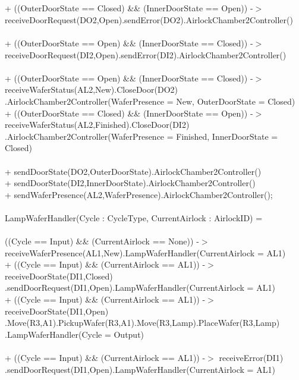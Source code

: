 \documentclass[a4paper,12pt]{article}
\begin{document}
	\\
	\\+ ((OuterDoorState == Closed) \&\& (InnerDoorState == Open)) -$>$ receiveDoorRequest(DO2,Open).sendError(DO2).AirlockChamber2Controller()
	\\
	\\+ ((OuterDoorState == Open) \&\& (InnerDoorState == Closed)) -$>$ receiveDoorRequest(DI2,Open).sendError(DI2).AirlockChamber2Controller()
	\\
	\\+ ((OuterDoorState == Open) \&\& (InnerDoorState == Closed)) -$>$ receiveWaferStatus(AL2,New).CloseDoor(DO2)
	\\.AirlockChamber2Controller(WaferPresence = New, OuterDoorState = Closed)
	\\+ ((OuterDoorState == Closed) \&\& (InnerDoorState == Open)) -$>$ receiveWaferStatus(AL2,Finished).CloseDoor(DI2)\\.AirlockChamber2Controller(WaferPresence = Finished, InnerDoorState = Closed)
	\\
	\\+ sendDoorState(DO2,OuterDoorState).AirlockChamber2Controller()
	\\+ sendDoorState(DI2,InnerDoorState).AirlockChamber2Controller()
	\\+ sendWaferPresence(AL2,WaferPresence).AirlockChamber2Controller();
	\\
	\\LampWaferHandler(Cycle : CycleType, CurrentAirlock : AirlockID) = 
	\\
	\\((Cycle == Input) \&\& (CurrentAirlock == None)) -$>$ receiveWaferPresence(AL1,New).LampWaferHandler(CurrentAirlock = AL1)
	\\+ ((Cycle == Input) \&\& (CurrentAirlock == AL1)) -$>$ receiveDoorState(DI1,Closed)
	\\.sendDoorRequest(DI1,Open).LampWaferHandler(CurrentAirlock = AL1)
	\\+ ((Cycle == Input) \&\& (CurrentAirlock == AL1)) -$>$ receiveDoorState(DI1,Open)
	\\.Move(R3,A1).PickupWafer(R3,A1).Move(R3,Lamp).PlaceWafer(R3,Lamp)
	\\.LampWaferHandler(Cycle = Output)
	\\
	\\ + ((Cycle == Input) \&\& (CurrentAirlock == AL1)) -$>$ receiveError(DI1)
	\\.sendDoorRequest(DI1,Open).LampWaferHandler(CurrentAirlock = AL1)
	\\
\end{document}
